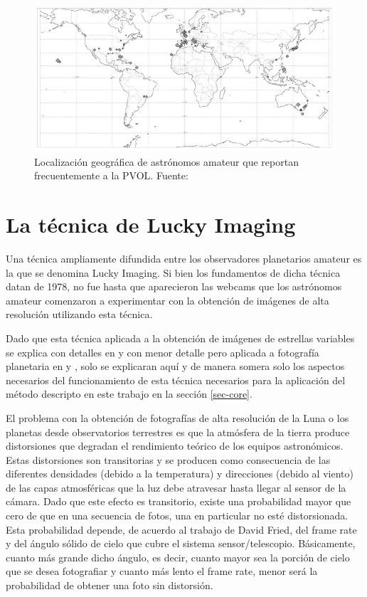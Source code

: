 \documentclass[a4paper,10pt]{article}
\begin{document}
\begin{figure}[H]
\includegraphics[scale=0.65]{amateur-map.jpg}
\caption{Localización geográfica de astrónomos amateur que reportan frecuentemente a la  
PVOL. Fuente: \cite{4}}
\label{amateur-map}
\end{figure}

\section{La técnica de Lucky Imaging}
Una técnica ampliamente difundida entre los observadores planetarios amateur es la que se 
denomina Lucky Imaging. Si bien los fundamentos de dicha técnica datan de 1978\cite{5}, 
no fue hasta que aparecieron las webcams que los astrónomos amateur comenzaron a 
experimentar con la obtención de imágenes de alta resolución utilizando esta técnica.

Dado que esta técnica aplicada a la obtención de imágenes de estrellas variables se 
explica con detalles en \cite{6} y con menor detalle pero aplicada a fotografía 
planetaria en \cite{1} y \cite{2}, solo se explicaran aquí y de manera somera solo los 
aspectos necesarios del funcionamiento de esta técnica necesarios para la aplicación del 
método descripto en este trabajo en la sección \ref{sec-core}.

El problema con la obtención de fotografías de alta resolución de la Luna o los planetas 
desde observatorios terrestres es que la atmósfera de la tierra produce distorsiones que 
degradan el rendimiento teórico de los equipos astronómicos. Estas distorsiones son 
transitorias y se producen como consecuencia de las diferentes densidades (debido a la 
temperatura) y direcciones (debido al viento) de las capas atmosféricas que la luz debe 
atravesar hasta llegar al sensor de la cámara.
Dado que este efecto es transitorio, existe una probabilidad mayor que cero de que en una 
secuencia de fotos, una en particular no esté distorsionada. Esta probabilidad depende, de 
acuerdo al trabajo de David Fried\cite{5}, del frame rate y del ángulo sólido de cielo que 
cubre el sistema sensor/telescopio. Básicamente, cuanto más grande dicho ángulo, es decir, 
cuanto mayor sea la porción de cielo que se desea fotografiar y cuanto más lento el frame 
rate, menor será la probabilidad de obtener una foto sin distorsión.
\end{document}

